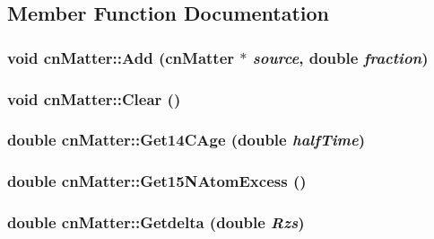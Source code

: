\subsection{Member Function Documentation}
\hypertarget{classcn_matter_aad24583a2b209ed86fbc261bbed83d4e}{
\subsubsection[{Add}]{\setlength{\rightskip}{0pt plus 5cm}void cnMatter::Add ({\bf cnMatter} $\ast$ {\em source}, \/  double {\em fraction})}}
\label{classcn_matter_aad24583a2b209ed86fbc261bbed83d4e}
\hypertarget{classcn_matter_a45d9021d50f76e167388bf5de2e406ed}{
\subsubsection[{Clear}]{\setlength{\rightskip}{0pt plus 5cm}void cnMatter::Clear ()}}
\label{classcn_matter_a45d9021d50f76e167388bf5de2e406ed}
\hypertarget{classcn_matter_a9c5f67a2d3dde92db86a0fc791f0592c}{
\subsubsection[{Get14CAge}]{\setlength{\rightskip}{0pt plus 5cm}double cnMatter::Get14CAge (double {\em halfTime})}}
\label{classcn_matter_a9c5f67a2d3dde92db86a0fc791f0592c}
\hypertarget{classcn_matter_ace56d55eee753b16e722a8506baa4b23}{
\subsubsection[{Get15NAtomExcess}]{\setlength{\rightskip}{0pt plus 5cm}double cnMatter::Get15NAtomExcess ()}}
\label{classcn_matter_ace56d55eee753b16e722a8506baa4b23}
\hypertarget{classcn_matter_ab6bf079d174644a74cc013717cea0912}{
\subsubsection[{Getdelta}]{\setlength{\rightskip}{0pt plus 5cm}double cnMatter::Getdelta (double {\em Rzs})}}
